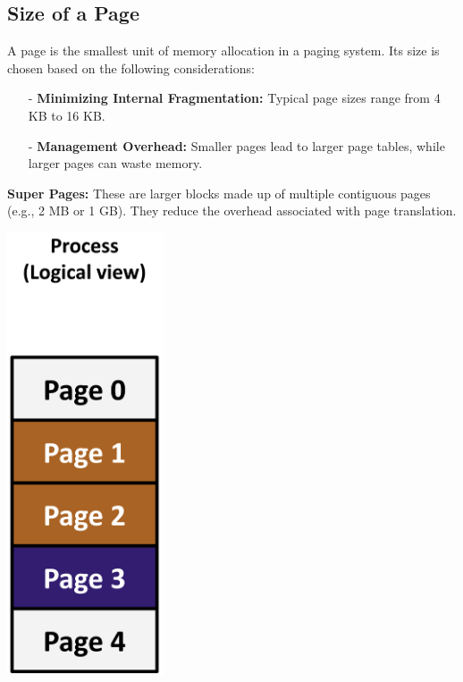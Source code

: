\subsection{Size of a Page}
A page is the smallest unit of memory allocation in a paging system. Its size is chosen based on the following considerations:\\
\noindent
\begin{minipage}{0.45\textwidth}
\begin{itemize}
  \item[-] \textbf{Minimizing Internal Fragmentation:} Typical page sizes range from 4 KB to 16 KB.
  \item[-] \textbf{Management Overhead:} Smaller pages lead to larger page tables, while larger pages can waste memory.
\end{itemize}

\textbf{Super Pages:} These are larger blocks made up of multiple contiguous pages (e.g., 2 MB or 1 GB). They reduce the overhead associated with page translation. \\
\end{minipage}%
\hfill
\vline
\hfill
\begin{minipage}{0.45\textwidth}
\begin{center}
  \includegraphics[width=0.35\textwidth]{chapters/L5/images/page-size.png}
\end{center}
\end{minipage}\\


